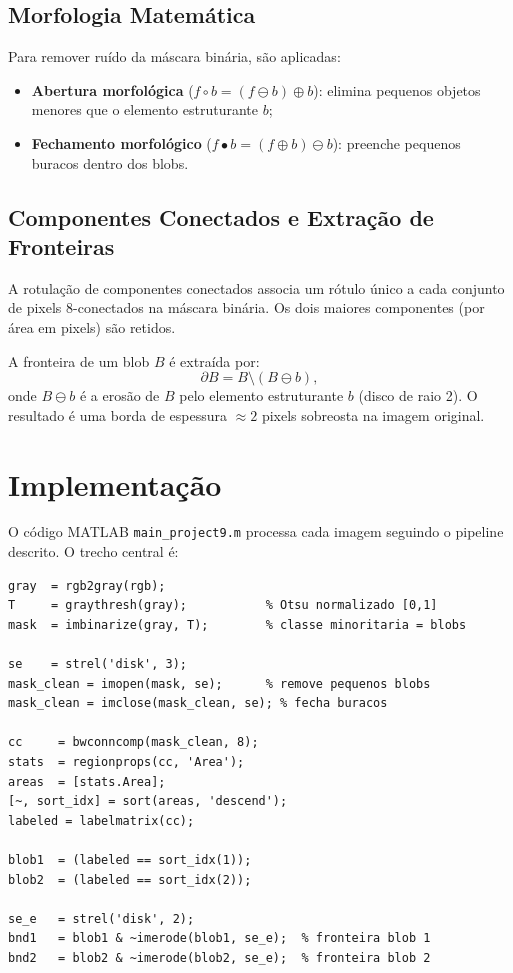 \documentclass[12pt,a4paper,oneside,brazil,chapter=TITLE,section=TITLE]{abntex2}
\begin{document}
\section{Morfologia Matem\'atica}

Para remover ru\'ido da m\'ascara bin\'aria, s\~ao aplicadas:
\begin{itemize}
  \item \textbf{Abertura morfol\'ogica} ($f \circ b = (f \ominus b) \oplus b$):
        elimina pequenos objetos menores que o elemento estruturante $b$;
  \item \textbf{Fechamento morfol\'ogico} ($f \bullet b = (f \oplus b) \ominus b$):
        preenche pequenos buracos dentro dos blobs.
\end{itemize}

\section{Componentes Conectados e Extra\c{c}\~ao de Fronteiras}

A rotula\c{c}\~ao de componentes conectados \cite{rosenfeld1966} associa
um r\'otulo \'unico a cada conjunto de pixels 8-conectados na m\'ascara
bin\'aria. Os dois maiores componentes (por \'area em pixels) s\~ao
retidos.

A fronteira de um blob $B$ \'e extra\'ida por:
\begin{equation}
  \partial B = B \setminus (B \ominus b),
\end{equation}
onde $B \ominus b$ \'e a eros\~ao de $B$ pelo elemento estruturante $b$
(disco de raio 2). O resultado \'e uma borda de espessura $\approx 2$
pixels sobreosta na imagem original.

\chapter{Implementa\c{c}\~ao}

O c\'odigo MATLAB \texttt{main\_project9.m} processa cada imagem
seguindo o pipeline descrito. O trecho central \'e:

\begin{lstlisting}[style=matlab,
  caption={Trecho central do pipeline de segmenta\c{c}\~ao}]
gray  = rgb2gray(rgb);
T     = graythresh(gray);           % Otsu normalizado [0,1]
mask  = imbinarize(gray, T);        % classe minoritaria = blobs

se    = strel('disk', 3);
mask_clean = imopen(mask, se);      % remove pequenos blobs
mask_clean = imclose(mask_clean, se); % fecha buracos

cc     = bwconncomp(mask_clean, 8);
stats  = regionprops(cc, 'Area');
areas  = [stats.Area];
[~, sort_idx] = sort(areas, 'descend');
labeled = labelmatrix(cc);

blob1  = (labeled == sort_idx(1));
blob2  = (labeled == sort_idx(2));

se_e   = strel('disk', 2);
bnd1   = blob1 & ~imerode(blob1, se_e);  % fronteira blob 1
bnd2   = blob2 & ~imerode(blob2, se_e);  % fronteira blob 2
\end{lstlisting}
\end{document}
